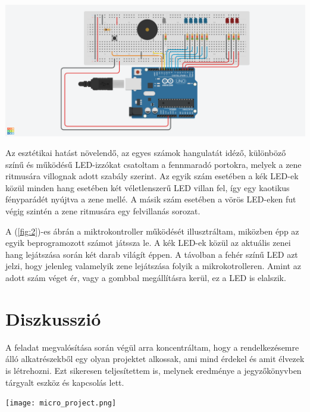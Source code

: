 \documentclass[12pt, a4paper]{article}
\begin{document}
\begin{center}
    \includegraphics[width=\textwidth]{Terrific-Turing-Inari.png}
     \label{fig:1}
\end{center}
Az esztétikai hatást növelendő, az egyes számok hangulatát idéző, különböző színű és működésű LED-izzókat csatoltam a fennmaradó portokra, melyek a zene ritmusára villognak adott szabály szerint. Az egyik szám esetében a kék LED-ek közül minden hang esetében két véletlenszerű LED villan fel, így egy kaotikus fényparádét nyújtva a zene mellé. A másik szám esetében a vörös LED-eken fut végig szintén a zene ritmusára egy felvillanás sorozat. \par
A (\ref{fig:2})-es ábrán a miktrokontroller működését illusztráltam, miközben épp az egyik beprogramozott számot játssza le. A kék LED-ek közül az aktuális zenei hang lejátszása során két darab világít éppen. A távolban a fehér színű LED azt jelzi, hogy jelenleg valamelyik zene lejátszása folyik a mikrokotrolleren. Amint az adott szám véget ér, vagy a gombbal megállításra kerül, ez a LED is elalszik.

\section{Diszkusszió}
A feladat megvalósítása során végül arra koncentráltam, hogy a rendelkezésemre álló alkatrészekből egy olyan projektet alkossak, ami mind érdekel és amit élvezek is létrehozni. Ezt sikeresen teljesítettem is, melynek eredménye a jegyzőkönyvben tárgyalt eszköz és kapcsolás lett.

\begin{center}
    \texttt{[image: micro\_project.png]}
     \label{fig:2}
\end{center}
\end{document}
